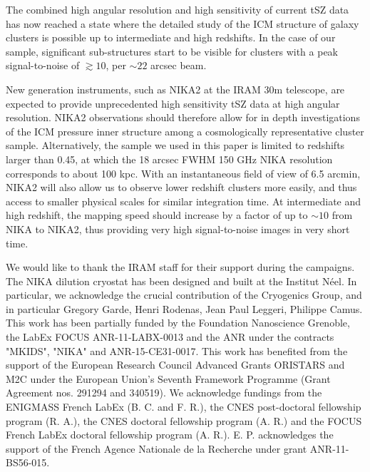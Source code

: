 \documentclass[twocolumn,traditabstract]{aa}
\begin{document}
The combined high angular resolution and high sensitivity of current tSZ data has now reached a state where the detailed study of the ICM structure of galaxy clusters is possible up to intermediate and high redshifts. In the case of our sample, significant sub-structures start to be visible for clusters with a peak signal-to-noise of $\gtrsim 10$, per $\sim 22$ arcsec beam.

New generation instruments, such as NIKA2 \citep{Calvo2016,Catalano2016} at the IRAM 30m telescope, are expected to provide unprecedented high sensitivity tSZ data at high angular resolution. NIKA2 observations \citep[such as the ones of the tSZ large program,][]{Comis2016} should therefore allow for in depth investigations of the ICM pressure inner structure among a cosmologically representative cluster sample. Alternatively, the sample we used in this paper is limited to redshifts larger than 0.45, at which the 18 arcsec FWHM 150 GHz NIKA resolution corresponds to about 100 kpc. With an instantaneous field of view of 6.5 arcmin, NIKA2 will also allow us to observe lower redshift clusters more easily, and thus access to smaller physical scales for similar integration time. At intermediate and high redshift, the mapping speed should increase by a factor of up to $\sim 10$ from NIKA to NIKA2, thus providing very high signal-to-noise images in very short time.

\begin{acknowledgements}
We would like to thank the IRAM staff for their support during the campaigns. 
The NIKA dilution cryostat has been designed and built at the Institut N\'eel. In particular, we acknowledge the crucial contribution of the Cryogenics Group, and  in particular Gregory Garde, Henri Rodenas, Jean Paul Leggeri, Philippe Camus. 
This work has been partially funded by the Foundation Nanoscience Grenoble, the LabEx FOCUS ANR-11-LABX-0013 and the ANR under the contracts "MKIDS", "NIKA" and ANR-15-CE31-0017. 
This work has benefited from the support of the European Research Council Advanced Grants ORISTARS and M2C under the European Union's Seventh Framework Programme (Grant Agreement nos. 291294 and 340519).
We acknowledge fundings from the ENIGMASS French LabEx (B. C. and F. R.), the CNES post-doctoral fellowship program (R. A.),  the CNES doctoral fellowship program (A. R.) and the FOCUS French LabEx doctoral fellowship program (A. R.).
E. P. acknowledges the support of the French Agence Nationale de la Recherche under grant ANR-11-BS56-015.
\end{acknowledgements}


\end{document}
